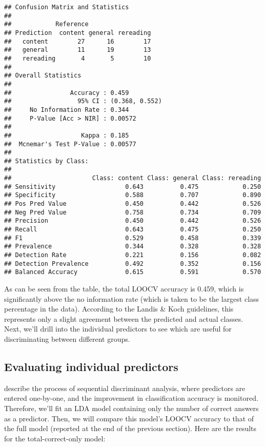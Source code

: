 \documentclass[11pt,]{article}
\begin{document}
\begin{verbatim}
## Confusion Matrix and Statistics
## 
##            Reference
## Prediction  content general rereading
##   content        27      16        17
##   general        11      19        13
##   rereading       4       5        10
## 
## Overall Statistics
##                                         
##                Accuracy : 0.459         
##                  95% CI : (0.368, 0.552)
##     No Information Rate : 0.344         
##     P-Value [Acc > NIR] : 0.00572       
##                                         
##                   Kappa : 0.185         
##  Mcnemar's Test P-Value : 0.00577       
## 
## Statistics by Class:
## 
##                      Class: content Class: general Class: rereading
## Sensitivity                   0.643          0.475            0.250
## Specificity                   0.588          0.707            0.890
## Pos Pred Value                0.450          0.442            0.526
## Neg Pred Value                0.758          0.734            0.709
## Precision                     0.450          0.442            0.526
## Recall                        0.643          0.475            0.250
## F1                            0.529          0.458            0.339
## Prevalence                    0.344          0.328            0.328
## Detection Rate                0.221          0.156            0.082
## Detection Prevalence          0.492          0.352            0.156
## Balanced Accuracy             0.615          0.591            0.570
\end{verbatim}

As can be seen from the table, the total LOOCV accuracy is 0.459, which
is significantly above the no information rate (which is taken to be the
largest class percentage in the data). According to the Landis \& Koch
\citep[1977; as reported in][]{salkindEncyclopediaMeasurementStatistics2007}
guidelines, this represents only a slight agreement between the
predicted and actual classes. Next, we'll drill into the individual
predictors to see which are useful for discriminating between different
groups.

\hypertarget{evaluating-individual-predictors}{%
\subsection{Evaluating individual
predictors}\label{evaluating-individual-predictors}}

\citet{tabachnickUsingMultivariateStatistics2012} describe the process
of sequential discriminant analysis, where predictors are entered
one-by-one, and the improvement in classification accuracy is monitored.
Therefore, we'll fit an LDA model containing only the number of correct
answers as a predictor. Then, we will compare this model's LOOCV
accuracy to that of the full model (reported at the end of the previous
section). Here are the results for the total-correct-only model:
\end{document}
